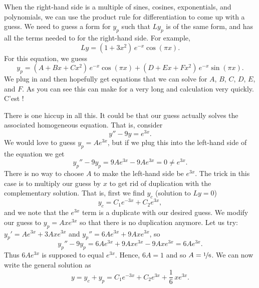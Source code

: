 When the right-hand side is a multiple of sines, cosines, exponentials,
and polynomials, we can use the product rule
for differentiation to come up with a guess.  We
need to guess a
form for $y_p$ such that $Ly_p$ is of the same form, and 
has all the terms needed to for 
the right-hand side.
For example,
\begin{equation*}
Ly = (1+3x^2)\,e^{-x}\cos (\pi x) .
\end{equation*}
For this equation, we guess
\begin{equation*}
y_p = (A + Bx + Cx^2)\,e^{-x} \cos (\pi x) + 
(D + Ex + Fx^2)\,e^{-x} \sin (\pi x) .
\end{equation*}
We plug in and then hopefully get equations that we can solve for
$A$, $B$, $C$, $D$, $E$, and $F$.
As you can see this can make for a very long and
calculation very quickly.  C'est ! %

\medskip

There is one hiccup in all this.  It could be that our guess actually
solves the associated homogeneous equation.  That is, consider
\begin{equation*}
y'' - 9y = e^{3x} .
\end{equation*}
We would love to guess $y_p = Ae^{3x}$, but if we plug this into the
left-hand side of the equation we get
\begin{equation*}
y_p''-9y_p = 9Ae^{3x} - 9Ae^{3x} = 0 \not= e^{3x} .
\end{equation*}
There is no way to choose $A$ to make the left-hand side be $e^{3x}$.
The trick in
this case
is to multiply our guess by $x$ to get rid of duplication with the
complementary solution.  That is, first we find $y_c$ (solution to $Ly =
0$)
\begin{equation*}
y_c = C_1 e^{-3x} + C_2 e^{3x} ,
\end{equation*}
and we note that the $e^{3x}$ term is a duplicate with our desired guess.
We modify our guess to $y_p = Axe^{3x}$ so that there is no
duplication anymore.  Let us try:
$y_p' = Ae^{3x} + 3Axe^{3x}$ and 
$y_p'' = 6Ae^{3x} + 9Axe^{3x}$, so
\begin{equation*}
y_p'' -9y_p = 6Ae^{3x} + 9Axe^{3x} - 9Axe^{3x} = 
6Ae^{3x} .
\end{equation*}
Thus $6Ae^{3x}$ is supposed to equal $e^{3x}$.  Hence,
$6A = 1$ and so $A=\nicefrac{1}{6}$.  We can now write the general
solution as
\begin{equation*}
y = y_c + y_p = 
C_1 e^{-3x} + C_2 e^{3x} + \frac{1}{6}\,xe^{3x} .
\end{equation*}

